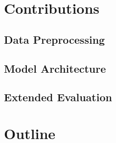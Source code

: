 

\section{Contributions}
\label{ch:intro-contributions}

\subsection{Data Preprocessing}
\label{ch:intro-contributions-dataPreprocessing}


\subsection{Model Architecture} %
\label{ch:intro-contributions-modelArchitecture}


\subsection{Extended Evaluation}
\label{ch:intro-contributions-extendedEvaluation}



\section{Outline}
\label{ch:intro-outline}
